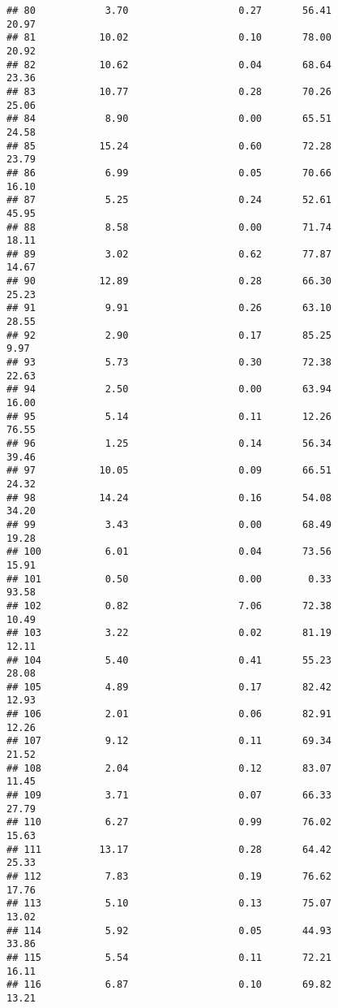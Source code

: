 \documentclass[
]{article}
\begin{document}
\begin{verbatim}
## 80            3.70                   0.27       56.41          20.97
## 81           10.02                   0.10       78.00          20.92
## 82           10.62                   0.04       68.64          23.36
## 83           10.77                   0.28       70.26          25.06
## 84            8.90                   0.00       65.51          24.58
## 85           15.24                   0.60       72.28          23.79
## 86            6.99                   0.05       70.66          16.10
## 87            5.25                   0.24       52.61          45.95
## 88            8.58                   0.00       71.74          18.11
## 89            3.02                   0.62       77.87          14.67
## 90           12.89                   0.28       66.30          25.23
## 91            9.91                   0.26       63.10          28.55
## 92            2.90                   0.17       85.25           9.97
## 93            5.73                   0.30       72.38          22.63
## 94            2.50                   0.00       63.94          16.00
## 95            5.14                   0.11       12.26          76.55
## 96            1.25                   0.14       56.34          39.46
## 97           10.05                   0.09       66.51          24.32
## 98           14.24                   0.16       54.08          34.20
## 99            3.43                   0.00       68.49          19.28
## 100           6.01                   0.04       73.56          15.91
## 101           0.50                   0.00        0.33          93.58
## 102           0.82                   7.06       72.38          10.49
## 103           3.22                   0.02       81.19          12.11
## 104           5.40                   0.41       55.23          28.08
## 105           4.89                   0.17       82.42          12.93
## 106           2.01                   0.06       82.91          12.26
## 107           9.12                   0.11       69.34          21.52
## 108           2.04                   0.12       83.07          11.45
## 109           3.71                   0.07       66.33          27.79
## 110           6.27                   0.99       76.02          15.63
## 111          13.17                   0.28       64.42          25.33
## 112           7.83                   0.19       76.62          17.76
## 113           5.10                   0.13       75.07          13.02
## 114           5.92                   0.05       44.93          33.86
## 115           5.54                   0.11       72.21          16.11
## 116           6.87                   0.10       69.82          13.21

\end{verbatim}
\end{document}
